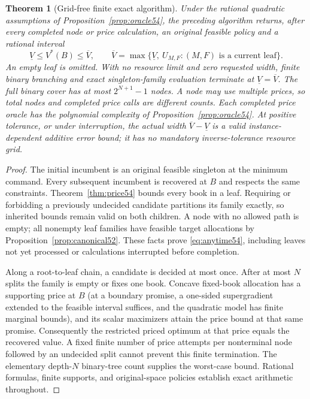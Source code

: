 \documentclass[11pt,letterpaper]{article}
\newtheorem{theorem}{Theorem}[section]
\theoremstyle{definition}\newtheorem{remark}[theorem]{Remark}
\begin{document}
\begin{theorem}[Grid-free finite exact algorithm]\label{thm:branch54}
Under the rational quadratic assumptions of Proposition~\ref{prop:oracle54}, the preceding algorithm returns, after every completed node or price calculation, an original feasible policy and a rational interval
\begin{equation}\label{eq:anytime54}
 \underline V\leq V^*(B)\leq\overline V,
 \qquad
 \overline V=\max\{\underline V,\ U_{M,F}: (M,F)\text{ is a current leaf}\}.
\end{equation}
An empty leaf is omitted. With no resource limit and zero requested width, finite binary branching and exact singleton-family evaluation terminate at $\underline V=\overline V$. The full binary cover has at most $2^{N+1}-1$ nodes. A node may use multiple prices, so total nodes and completed price calls are different counts. Each completed price oracle has the polynomial complexity of Proposition~\ref{prop:oracle54}. At positive tolerance, or under interruption, the actual width $\overline V-\underline V$ is a valid instance-dependent additive error bound; it has no mandatory inverse-tolerance resource grid.
\end{theorem}
\begin{proof}
The initial incumbent is an original feasible singleton at the minimum command. Every subsequent incumbent is recovered at $B$ and respects the same constraints. Theorem~\ref{thm:price54} bounds every book in a leaf. Requiring or forbidding a previously undecided candidate partitions its family exactly, so inherited bounds remain valid on both children. A node with no allowed path is empty; all nonempty leaf families have feasible target allocations by Proposition~\ref{prop:canonical52}. These facts prove \eqref{eq:anytime54}, including leaves not yet processed or calculations interrupted before completion.

Along a root-to-leaf chain, a candidate is decided at most once. After at most $N$ splits the family is empty or fixes one book. Concave fixed-book allocation has a supporting price at $B$ (at a boundary promise, a one-sided supergradient extended to the feasible interval suffices, and the quadratic model has finite marginal bounds), and its scalar maximizers attain the price bound at that same promise. Consequently the restricted priced optimum at that price equals the recovered value. A fixed finite number of price attempts per nonterminal node followed by an undecided split cannot prevent this finite termination. The elementary depth-$N$ binary-tree count supplies the worst-case bound. Rational formulas, finite supports, and original-space policies establish exact arithmetic throughout.
\end{proof}
\end{document}
